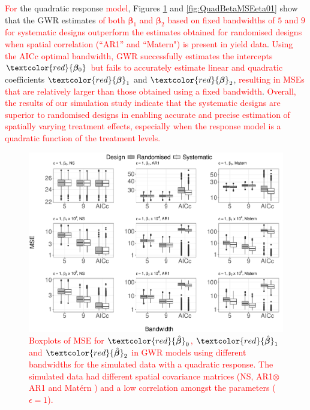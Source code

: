 \documentclass[a4paper]{article} 	%
\newcommand{\Matern}{Mat\'ern }
\newcommand{\revision}[1]{\textcolor{red}{#1}}
\newcommand{\zc}[1]{\textcolor{red}{#1}}
\begin{document}
\revision{For} the quadratic response \revision{model}, Figures \ref{fig:QuadBetaMSE} and \ref{fig:QuadBetaMSEeta01} show that the GWR estimates \revision{of both ${\bm{\beta}}_{1}$ and ${\bm{\beta}}_{2}$ based on fixed bandwidths of $5$ and $9$ for systematic designs outperform the estimates obtained for randomised designs when spatial correlation (``AR1'' and ``Matern") is present in yield data}. \revision{Using the AICc optimal bandwidth, GWR successfully estimates the intercepts $\zc{\bm{\beta}_0}$ but fails to accurately estimate} \zc{linear and quadratic} coefficients $\zc{\bm{\beta}}_1$ and $\zc{\bm{\beta}}_2$, \revision{resulting in MSEs that are relatively larger than those obtained using a fixed bandwidth}. \revision{Overall, the results of our simulation study indicate that the systematic designs are superior to randomised designs in enabling accurate and precise estimation of spatially varying treatment effects, especially when the response model is a quadratic function of the treatment levels.} 




\begin{figure}[!thp]
	\centering
	\includegraphics[width=\linewidth]{Col_QuaCombMSE_newpar_1K_V4.pdf}
	\caption{\zc{Boxplots of MSE for $\zc{\hat{\bm{\beta}}}_0$, $\zc{\hat{\bm{\beta}}}_1$ and $\zc{\hat{\bm{\beta}}}_2$ in GWR models using different bandwidths for the simulated data with a quadratic response. The simulated data had different spatial covariance matrices (NS, AR1$\otimes$AR1 and \Matern) and a low correlation amongst the parameters ($\epsilon=1$).}} \label{fig:QuadBetaMSE}
\end{figure}
\end{document}

